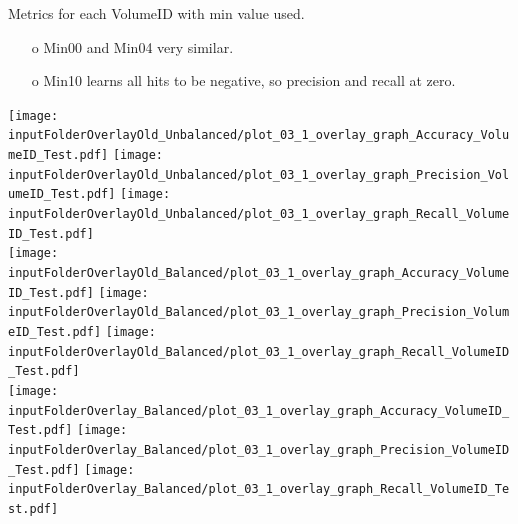\documentclass{beamer}
\begin{document}
\begin{frame}{Metrics for each VolumeID with min value used.}
\begin{enumerate}
\item[o] Min00 and Min04 very similar. 
\item[o] Min10 learns all hits to be negative, so precision and recall at zero.
\end{enumerate}
\centering
\texttt{[image: \\inputFolderOverlayOld\_Unbalanced/plot\_03\_1\_overlay\_graph\_Accuracy\_VolumeID\_Test.pdf]}
\texttt{[image: \\inputFolderOverlayOld\_Unbalanced/plot\_03\_1\_overlay\_graph\_Precision\_VolumeID\_Test.pdf]}
\texttt{[image: \\inputFolderOverlayOld\_Unbalanced/plot\_03\_1\_overlay\_graph\_Recall\_VolumeID\_Test.pdf]}\\
\texttt{[image: \\inputFolderOverlayOld\_Balanced/plot\_03\_1\_overlay\_graph\_Accuracy\_VolumeID\_Test.pdf]}
\texttt{[image: \\inputFolderOverlayOld\_Balanced/plot\_03\_1\_overlay\_graph\_Precision\_VolumeID\_Test.pdf]}
\texttt{[image: \\inputFolderOverlayOld\_Balanced/plot\_03\_1\_overlay\_graph\_Recall\_VolumeID\_Test.pdf]}\\
\texttt{[image: \\inputFolderOverlay\_Balanced/plot\_03\_1\_overlay\_graph\_Accuracy\_VolumeID\_Test.pdf]}
\texttt{[image: \\inputFolderOverlay\_Balanced/plot\_03\_1\_overlay\_graph\_Precision\_VolumeID\_Test.pdf]}
\texttt{[image: \\inputFolderOverlay\_Balanced/plot\_03\_1\_overlay\_graph\_Recall\_VolumeID\_Test.pdf]}\\
\end{frame}
\end{document}
